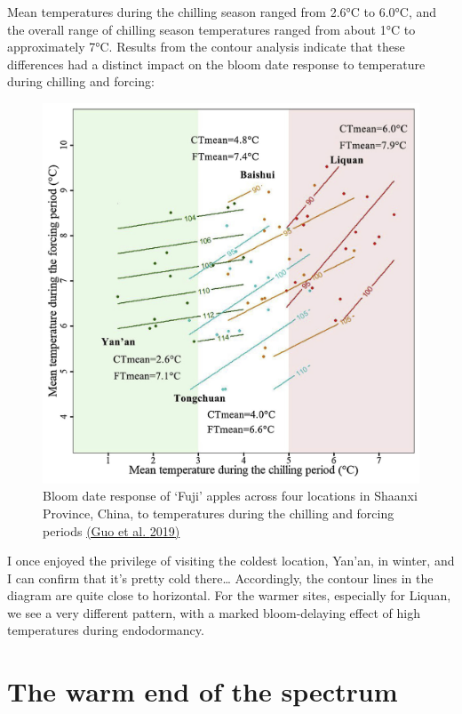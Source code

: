 \documentclass[
]{book}
\begin{document}
Mean temperatures during the chilling season ranged from 2.6°C to 6.0°C, and the overall range of chilling season temperatures ranged from about 1°C to approximately 7°C. Results from the contour analysis indicate that these differences had a distinct impact on the bloom date response to temperature during chilling and forcing:

\begin{figure}
\centering
\includegraphics{pictures/Shaanxi_contours.jpg}
\caption{Bloom date response of `Fuji' apples across four locations in Shaanxi Province, China, to temperatures during the chilling and forcing periods \href{https://doi.org/10.1016/j.agrformet.2019.01.038}{(Guo et al. \protect\hyperlink{ref-guo2019distribution}{2019})}}
\end{figure}

I once enjoyed the privilege of visiting the coldest location, Yan'an, in winter, and I can confirm that it's pretty cold there\ldots{} Accordingly, the contour lines in the diagram are quite close to horizontal. For the warmer sites, especially for Liquan, we see a very different pattern, with a marked bloom-delaying effect of high temperatures during endodormancy.

\hypertarget{the-warm-end-of-the-spectrum}{%
\section{The warm end of the spectrum}\label{the-warm-end-of-the-spectrum}}
\end{document}
